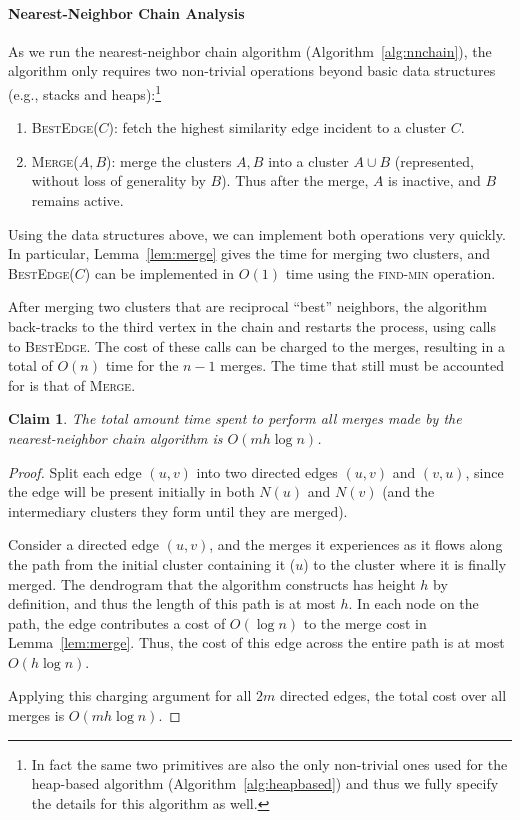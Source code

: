 \documentclass[11pt]{article}
\newtheorem{claim}{Claim}
\begin{document}
\paragraph{Nearest-Neighbor Chain Analysis}
As we run the nearest-neighbor chain algorithm (Algorithm~\ref{alg:nnchain}), the algorithm only requires two non-trivial operations beyond basic data structures (e.g., stacks and heaps):\footnote{In fact the same two primitives are also the only non-trivial ones used for the heap-based algorithm (Algorithm~\ref{alg:heapbased}) and thus we fully specify the details for this algorithm as well.}
\begin{enumerate}
  \item \textsc{BestEdge}($C$): fetch the highest similarity edge incident to a cluster $C$.
  \item \textsc{Merge}($A, B$): merge the clusters $A,B$ into a cluster $A \cup B$ (represented, without loss of generality by $B$). Thus after the merge, $A$ is inactive, and $B$ remains active.
\end{enumerate}

Using the data structures above, we can implement both operations very quickly. 
In particular, Lemma~\ref{lem:merge} gives the time for merging two clusters, and \textsc{BestEdge}($C$) can be implemented in $O(1)$ time using the \textsc{find-min} operation.

After merging two clusters that are reciprocal ``best'' neighbors, the algorithm back-tracks to the third vertex in the chain and restarts the process, using calls to \textsc{BestEdge}.
The cost of these calls can be charged to the merges, resulting in a total of $O(n)$ time for the $n-1$ merges.
The time that still must be accounted for is that of \textsc{Merge}.

\begin{claim}\label{claim:mergecost}
The total amount time spent to perform all merges made by the nearest-neighbor chain algorithm is $O(mh\log n)$.
\end{claim}
\begin{proof}
Split each edge $(u,v)$ into two directed edges $(u,v)$ and $(v,u)$, since the edge will be present initially in both $N(u)$ and $N(v)$ (and the intermediary clusters they form until they are merged).

Consider a directed edge $(u,v)$, and the merges it experiences as it flows along the path from the initial cluster containing it ($u$) to the cluster where it is finally merged.
The dendrogram that the algorithm constructs has height $h$ by definition, and thus the length of this path is at most $h$.
In each node on the path, the edge contributes a cost of $O(\log n)$ to the merge cost in Lemma~\ref{lem:merge}.
Thus, the cost of this edge across the entire path is at most $O(h \log n)$.

Applying this charging argument for all $2m$ directed edges, the total cost over all merges is $O(mh\log n)$.
\end{proof}
\end{document}
